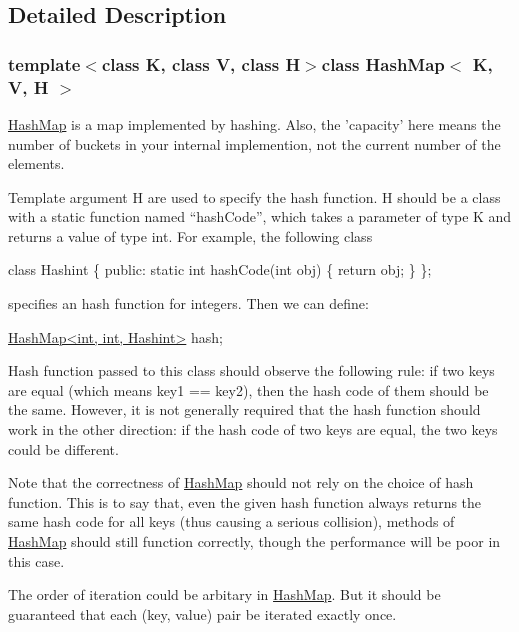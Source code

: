 \subsection{Detailed Description}
\subsubsection*{template$<$class K, class V, class H$>$class Hash\-Map$<$ K, V, H $>$}

\hyperlink{class_hash_map}{Hash\-Map} is a map implemented by hashing. Also, the 'capacity' here means the number of buckets in your internal implemention, not the current number of the elements.

Template argument H are used to specify the hash function. H should be a class with a static function named ``hash\-Code'', which takes a parameter of type K and returns a value of type int. For example, the following class 
\begin{DoxyCode}
\textcolor{keyword}{class }Hashint \{
\textcolor{keyword}{public}:
    \textcolor{keyword}{static} \textcolor{keywordtype}{int} hashCode(\textcolor{keywordtype}{int} obj) \{
        \textcolor{keywordflow}{return} obj;
    \}
\};
\end{DoxyCode}
 specifies an hash function for integers. Then we can define\-: 
\begin{DoxyCode}
\hyperlink{class_hash_map}{HashMap<int, int, Hashint>} hash;
\end{DoxyCode}


Hash function passed to this class should observe the following rule\-: if two keys are equal (which means key1 == key2), then the hash code of them should be the same. However, it is not generally required that the hash function should work in the other direction\-: if the hash code of two keys are equal, the two keys could be different.

Note that the correctness of \hyperlink{class_hash_map}{Hash\-Map} should not rely on the choice of hash function. This is to say that, even the given hash function always returns the same hash code for all keys (thus causing a serious collision), methods of \hyperlink{class_hash_map}{Hash\-Map} should still function correctly, though the performance will be poor in this case.

The order of iteration could be arbitary in \hyperlink{class_hash_map}{Hash\-Map}. But it should be guaranteed that each (key, value) pair be iterated exactly once. 

